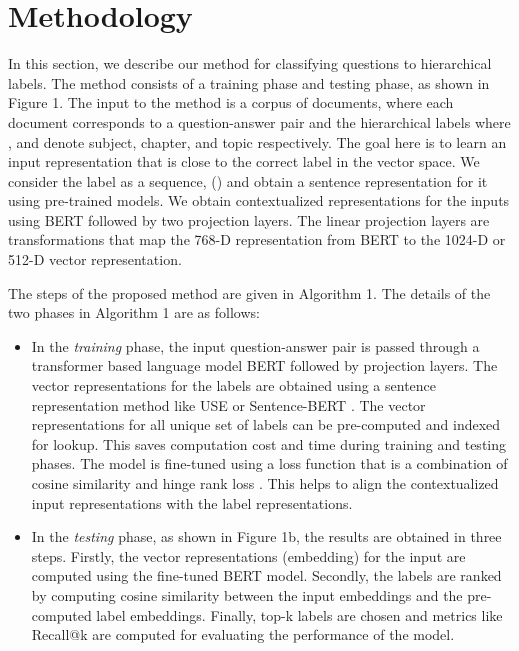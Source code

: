\documentclass[runningheads, envcountsame, a4paper]{llncs}
\begin{document}
\section{Methodology}
In this section, we describe our method for classifying questions to  hierarchical labels. The method consists of a training phase and testing phase, as shown in Figure 1. The input to the method is a corpus of documents,  where each document corresponds to a question-answer pair and the hierarchical labels  where ,
 and  denote subject, chapter, and topic respectively. The goal here is to learn an input representation that is close to the correct label in the vector space. We consider the label  as a sequence, () and obtain a sentence representation for it using pre-trained models. We obtain contextualized representations for the inputs using BERT \cite{BERT} followed by two projection layers. The linear projection layers are transformations that map the 768-D representation from BERT to the 1024-D or 512-D vector representation.

 
The steps of the proposed method are given in Algorithm 1.
The details of the two phases in Algorithm 1 are as follows:
 \setlength{\parindent}{0pt}
\let\labelitemi\labelitemii
\begin{itemize}
  \setlength\itemsep{0.5em}
\item In the \textit{training} phase, the input question-answer pair is passed through a transformer based language model BERT followed by projection layers. The vector representations for the labels are obtained using a sentence representation method like USE \cite{cer-etal-2018-universal} or Sentence-BERT \cite{reimers-gurevych-2019-sentence}. The vector representations for all unique set of labels can be pre-computed and indexed for lookup. This saves computation cost and time during training and testing phases. The model is fine-tuned using a loss function that is a combination of cosine similarity and hinge rank loss \cite{frome2013devise}. This helps to align the contextualized input representations with the label representations.

\item In the \textit{testing} phase, as shown in Figure 1b, the results are obtained in three steps. Firstly, the vector representations (embedding) for the input are computed using the fine-tuned BERT model. Secondly, the labels are ranked by computing cosine similarity between the input embeddings and the pre-computed label embeddings. Finally, top-k labels are chosen and metrics like Recall@k are computed for evaluating the performance of the model.
    \end{itemize}
\end{document}
